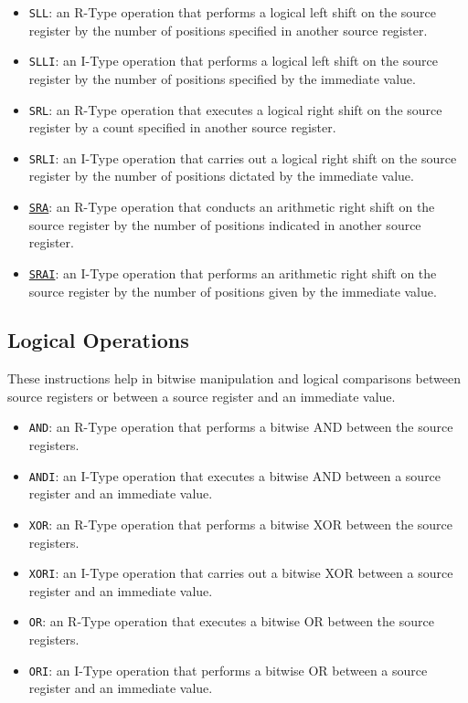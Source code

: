 \begin{itemize}%
	\item \texttt{SLL}: an R-Type operation that performs a logical left shift on the source register by the number of positions specified in another source register.
	\item \texttt{SLLI}: an I-Type operation that performs a logical left shift on the source register by the number of positions specified by the immediate value.
	\item \texttt{SRL}: an R-Type operation that executes a logical right shift on the source register by a count specified in another source register.
	\item \texttt{SRLI}: an I-Type operation that carries out a logical right shift on the source register by the number of positions dictated by the immediate value.
	\item \underline{\texttt{SRA}}: an R-Type operation that conducts an arithmetic right shift on the source register by the number of positions indicated in another source register.
	\item \underline{\texttt{SRAI}}: an I-Type operation that performs an arithmetic right shift on the source register by the number of positions given by the immediate value.
\end{itemize}

\subsection{Logical Operations}
These instructions help in bitwise manipulation and logical comparisons between source registers or between a source register and an immediate value.

\begin{itemize}%
	\item \texttt{AND}: an R-Type operation that performs a bitwise AND between the source registers.
	\item \texttt{ANDI}: an I-Type operation that executes a bitwise AND between a source register and an immediate value.
	\item \texttt{XOR}: an R-Type operation that performs a bitwise XOR between the source registers.
	\item \texttt{XORI}: an I-Type operation that carries out a bitwise XOR between a source register and an immediate value.
	\item \texttt{OR}: an R-Type operation that executes a bitwise OR between the source registers.
	\item \texttt{ORI}: an I-Type operation that performs a bitwise OR between a source register and an immediate value.
\end{itemize}

